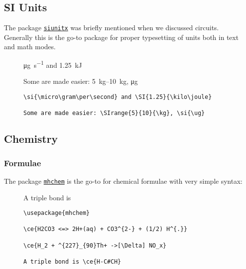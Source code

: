 \subsection{SI Units}
The package \href{https://mirror.ox.ac.uk/sites/ctan.org/macros/latex/contrib/siunitx/siunitx.pdf}{\texttt{siunitx}} was briefly mentioned when we discussed circuits.
Generally this is the go-to package for proper typesetting of units both in text and math modes.

\begin{figure}[h]
\centering
\begin{minipage}{0.45\textwidth}
    \si{\micro\gram\per\second} and \SI{1.25}{\kilo\joule}

    Some are made easier: \SIrange{5}{10}{\kg}, \si{\ug}
\end{minipage}
\hfill
\begin{minipage}{0.45\textwidth}
\begin{lstlisting}
\si{\micro\gram\per\second} and \SI{1.25}{\kilo\joule}

Some are made easier: \SIrange{5}{10}{\kg}, \si{\ug}
\end{lstlisting}
\end{minipage}
\end{figure}
\clearpage
\subsection{Chemistry}
\subsubsection{Formulae}
The package \href{https://texdoc.org/serve/mhchem/0}{\texttt{mhchem}} is the go-to for chemical formulae with very simple syntax:
\begin{figure}[h]
\centering
\begin{minipage}{0.49\textwidth}\centering


    A triple bond is 
\end{minipage}
\hfill
\begin{minipage}{0.49\textwidth}
    \begin{lstlisting}
\usepackage{mhchem}

\ce{H2CO3 <=> 2H+(aq) + CO3^{2-} + (1/2) H^{.}}

\ce{H_2 + ^{227}_{90}Th+ ->[\Delta] NO_x}

A triple bond is \ce{H-C#CH}

\end{lstlisting}
\end{minipage}
\end{figure}

